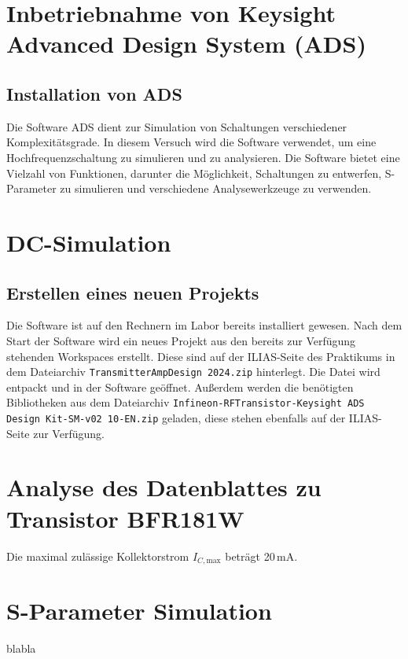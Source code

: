 
\section{Inbetriebnahme von Keysight Advanced Design System (ADS)}
\subsection{Installation von ADS}
Die Software \ac{ADS} dient zur Simulation von Schaltungen verschiedener Komplexitätsgrade. 
In diesem Versuch wird die Software verwendet, um eine Hochfrequenzschaltung zu simulieren und zu analysieren. 
Die Software bietet eine Vielzahl von Funktionen, darunter die Möglichkeit, Schaltungen zu entwerfen, S-Parameter zu simulieren und verschiedene Analysewerkzeuge zu verwenden.
\section{DC-Simulation}
\subsection{Erstellen eines neuen Projekts}
Die Software ist auf den Rechnern im Labor bereits installiert gewesen. 
Nach dem Start der Software wird ein neues Projekt aus den bereits zur Verfügung stehenden Workspaces erstellt. 
Diese sind auf der ILIAS-Seite des Praktikums in dem Dateiarchiv \texttt{TransmitterAmpDesign 2024.zip} hinterlegt. 
Die Datei wird entpackt und in der Software geöffnet. Außerdem werden die benötigten Bibliotheken aus dem Dateiarchiv \texttt{Infineon-RFTransistor-Keysight ADS Design Kit-SM-v02 10-EN.zip} geladen, diese stehen ebenfalls auf der ILIAS-Seite zur Verfügung.
\section{Analyse des Datenblattes zu Transistor BFR181W}
Die maximal zulässige Kollektorstrom $I_{C,\mathrm{max}}$ beträgt 20\,mA.
\section{S-Parameter Simulation}

blabla
\clearpage
